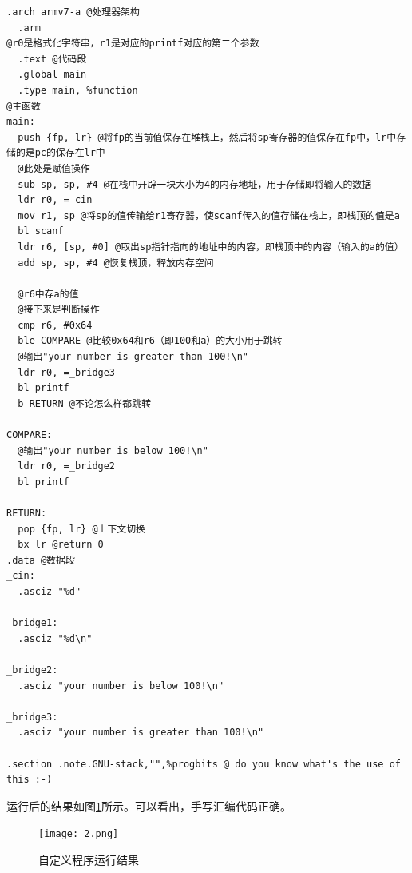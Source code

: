 \documentclass[UTF8,a4paper,10pt]{ctexart}
\begin{document}
\begin{lstlisting}[title = 自定义程序改写后的汇编代码]
  .arch armv7-a @处理器架构
  .arm
@r0是格式化字符串，r1是对应的printf对应的第二个参数
  .text @代码段
  .global main
  .type main, %function
@主函数
main: 
  push {fp, lr} @将fp的当前值保存在堆栈上，然后将sp寄存器的值保存在fp中，lr中存储的是pc的保存在lr中
  @此处是赋值操作
  sub sp, sp, #4 @在栈中开辟一块大小为4的内存地址，用于存储即将输入的数据
  ldr r0, =_cin
  mov r1, sp @将sp的值传输给r1寄存器，使scanf传入的值存储在栈上，即栈顶的值是a
  bl scanf
  ldr r6, [sp, #0] @取出sp指针指向的地址中的内容，即栈顶中的内容（输入的a的值）
  add sp, sp, #4 @恢复栈顶，释放内存空间

  @r6中存a的值
  @接下来是判断操作
  cmp r6, #0x64
  ble COMPARE @比较0x64和r6（即100和a）的大小用于跳转
  @输出"your number is greater than 100!\n"
  ldr r0, =_bridge3
  bl printf
  b RETURN @不论怎么样都跳转

COMPARE:
  @输出"your number is below 100!\n"
  ldr r0, =_bridge2
  bl printf

RETURN:
  pop {fp, lr} @上下文切换
  bx lr @return 0
.data @数据段
_cin:
  .asciz "%d"

_bridge1:
  .asciz "%d\n"

_bridge2:
  .asciz "your number is below 100!\n"

_bridge3:
  .asciz "your number is greater than 100!\n"

.section .note.GNU-stack,"",%progbits @ do you know what's the use of this :-)
\end{lstlisting}



运行后的结果如图\ref{fig:2}所示。可以看出，手写汇编代码正确。
\begin{figure}[H]
    \centering
    \texttt{[image: 2.png]}
    \caption{自定义程序运行结果}
    \label{fig:2}
\end{figure}
















\end{document}
